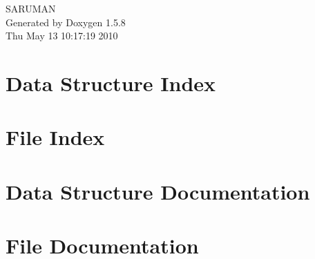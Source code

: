 \documentclass[a4paper]{book}
\begin{document}
\begin{titlepage}
\vspace*{7cm}
\begin{center}
{\Large SARUMAN }\\
\vspace*{1cm}
{\large Generated by Doxygen 1.5.8}\\
\vspace*{0.5cm}
{\small Thu May 13 10:17:19 2010}\\
\end{center}
\end{titlepage}
\clearemptydoublepage
{}
\tableofcontents
\clearemptydoublepage
{}
\chapter{Data Structure Index}

\chapter{File Index}

\chapter{Data Structure Documentation}




\chapter{File Documentation}








\printindex
\end{document}
